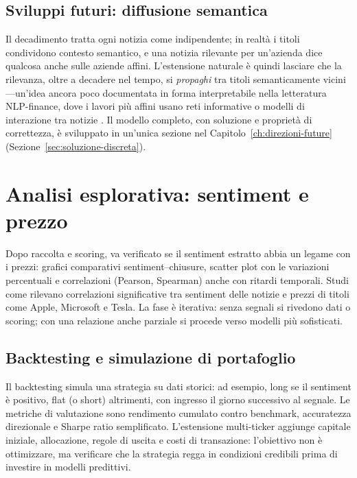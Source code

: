 \subsection{Sviluppi futuri: diffusione semantica}

Il decadimento tratta ogni notizia come indipendente; in realtà i titoli condividono contesto semantico, e una notizia rilevante per un'azienda dice qualcosa anche sulle aziende affini.
L'estensione naturale è quindi lasciare che la rilevanza, oltre a decadere nel tempo, si \emph{propaghi} tra titoli semanticamente vicini---un'idea ancora poco documentata in forma interpretabile nella letteratura NLP-finance, dove i lavori più affini usano reti informative \parencite{wan2021sentimentdiffusion} o modelli di interazione tra notizie \parencite{wang2024finin}.
Il modello completo, con soluzione e proprietà di correttezza, è sviluppato in un'unica sezione nel Capitolo~\ref{ch:direzioni-future} (Sezione~\ref{sec:soluzione-discreta}).

\section{Analisi esplorativa: sentiment e prezzo}

Dopo raccolta e scoring, va verificato se il sentiment estratto abbia un legame con i prezzi: grafici comparativi sentiment--chiusure, scatter plot con le variazioni percentuali e correlazioni (Pearson, Spearman) anche con ritardi temporali.
Studi come \textcite{cristescu2023wavelet} rilevano correlazioni significative tra sentiment delle notizie e prezzi di titoli come Apple, Microsoft e Tesla.
La fase è iterativa: senza segnali si rivedono dati o scoring; con una relazione anche parziale si procede verso modelli più sofisticati.

\subsection{Backtesting e simulazione di portafoglio}

Il backtesting simula una strategia su dati storici: ad esempio, long se il sentiment è positivo, flat (o short) altrimenti, con ingresso il giorno successivo al segnale.
Le metriche di valutazione sono rendimento cumulato contro benchmark, accuratezza direzionale e Sharpe ratio semplificato.
L'estensione multi-ticker aggiunge capitale iniziale, allocazione, regole di uscita e costi di transazione: l'obiettivo non è ottimizzare, ma verificare che la strategia regga in condizioni credibili prima di investire in modelli predittivi.

